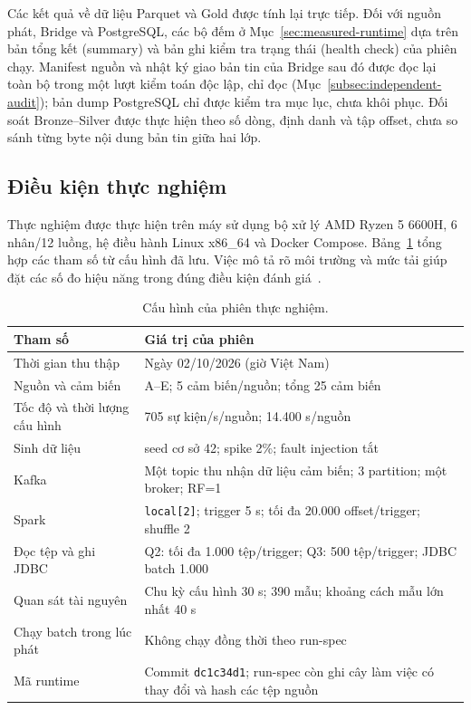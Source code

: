 Các kết quả về dữ liệu Parquet và Gold được tính lại trực tiếp. Đối với nguồn phát, Bridge và PostgreSQL, các bộ đếm ở Mục~\ref{sec:measured-runtime} dựa trên bản tổng kết (summary) và bản ghi kiểm tra trạng thái (health check) của phiên chạy. Manifest nguồn và nhật ký giao bản tin của Bridge sau đó được đọc lại toàn bộ trong một lượt kiểm toán độc lập, chỉ đọc (Mục~\ref{subsec:independent-audit}); bản dump PostgreSQL chỉ được kiểm tra mục lục, chưa khôi phục. Đối soát Bronze--Silver được thực hiện theo số dòng, định danh và tập offset, chưa so sánh từng byte nội dung bản tin giữa hai lớp.

\subsection{Điều kiện thực nghiệm}
Thực nghiệm được thực hiện trên máy sử dụng bộ xử lý AMD Ryzen 5 6600H, 6 nhân/12 luồng, hệ điều hành Linux x86\_64 và Docker Compose. Bảng~\ref{tab:run-conditions} tổng hợp các tham số từ cấu hình đã lưu. Việc mô tả rõ môi trường và mức tải giúp đặt các số đo hiệu năng trong đúng điều kiện đánh giá~\cite{iot_testbed_2021,kafka_patterns_benchmark_2025}.

\begin{table}[H]
\centering
\caption{Cấu hình của phiên thực nghiệm.}
\label{tab:run-conditions}
\small
\begin{tabularx}{\textwidth}{l X}
\toprule
\textbf{Tham số} & \textbf{Giá trị của phiên} \\
\midrule
Thời gian thu thập & Ngày 02/10/2026 (giờ Việt Nam) \\
Nguồn và cảm biến & A--E; 5 cảm biến/nguồn; tổng 25 cảm biến \\
Tốc độ và thời lượng cấu hình & 705 sự kiện/s/nguồn; 14.400 s/nguồn \\
Sinh dữ liệu & seed cơ sở 42; spike 2\%; fault injection tắt \\
Kafka & Một topic thu nhận dữ liệu cảm biến; 3 partition; một broker; RF=1 \\
Spark & \texttt{local[2]}; trigger 5 s; tối đa 20.000 offset/trigger; shuffle 2 \\
Đọc tệp và ghi JDBC & Q2: tối đa 1.000 tệp/trigger; Q3: 500 tệp/trigger; JDBC batch 1.000 \\
Quan sát tài nguyên & Chu kỳ cấu hình 30 s; 390 mẫu; khoảng cách mẫu lớn nhất 40 s \\
Chạy batch trong lúc phát & Không chạy đồng thời theo run-spec \\
Mã runtime & Commit \texttt{dc1c34d1}; run-spec còn ghi cây làm việc có thay đổi và hash các tệp nguồn \\
\bottomrule
\end{tabularx}
\end{table}

